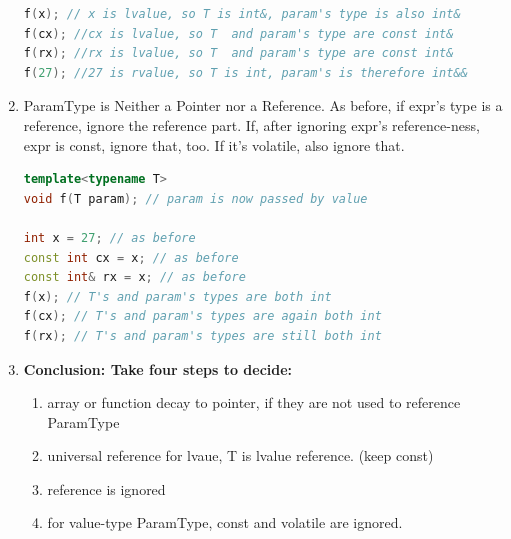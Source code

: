 \documentclass[a4paper,12pt,twoside]{book}
\begin{document}
\begin{enumerate}
\begin{lstlisting}[frame=single, language=c++]
f(x); // x is lvalue, so T is int&, param's type is also int&
f(cx); //cx is lvalue, so T  and param's type are const int&
f(rx); //rx is lvalue, so T  and param's type are const int&
f(27); //27 is rvalue, so T is int, param's is therefore int&&
\end{lstlisting}

\item ParamType is Neither a Pointer nor a Reference. As before, if expr's type is a reference, ignore the reference part. If, after ignoring expr's reference-ness, expr is const, ignore that, too. If it's
volatile, also ignore that.
\begin{lstlisting}[frame=single, language=c++]
template<typename T>
void f(T param); // param is now passed by value

int x = 27; // as before
const int cx = x; // as before
const int& rx = x; // as before
f(x); // T's and param's types are both int
f(cx); // T's and param's types are again both int
f(rx); // T's and param's types are still both int
\end{lstlisting}

\item \textbf{Conclusion:  Take four steps to decide:}
\begin{enumerate}
\item array or function decay to pointer, if they are not used to reference ParamType
\item universal reference for lvaue, T is lvalue reference. (keep const)
\item reference is ignored
\item for value-type ParamType, const and volatile are ignored.
\end{enumerate}

\end{enumerate}
\end{document}
